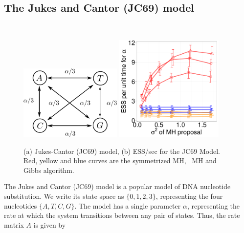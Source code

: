 {\vspace{-.23in}
  \subsection{The Jukes and Cantor (JC69) model}~
  \begin{figure}%
  \begin{minipage}[!hp]{0.75\linewidth}
    \includegraphics[width=0.45\textwidth, angle=0]{figs/jc_model.pdf}
    \includegraphics[width=0.48\textwidth, angle=0]{figs/jc.pdf}
     \label{fig:ESS_JC}
  \end{minipage}
  \begin{minipage}[!hp]{0.23\linewidth}
  \caption{(a) Jukes-Cantor (JC69) model, (b)
    ESS/sec for the JC69 Model. Red, yellow and blue curves are the 
      symmetrized MH, \naive\ MH and Gibbs algorithm. }
  \end{minipage}
\vspace{-.2in}
  \end{figure}
  The Jukes and Cantor (JC69) model is a popular model of DNA nucleotide
  substitution.  We write its state space as $\{0, 1, 2, 3\}$, representing the 
  four nucleotides $\{A, T, C, G\}$.  The model has a single parameter $\alpha$, 
  representing the rate at which the system transitions between any pair of 
  states. Thus, the rate matrix $A$ is given by 
}
